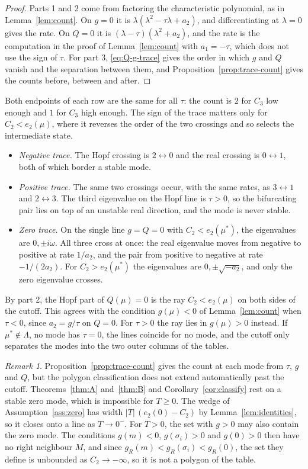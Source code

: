 \documentclass[11pt]{article}
\theoremstyle{definition}
\theoremstyle{remark}
\newtheorem{remark}{Remark}
\begin{document}
\begin{proof}
Parts 1 and 2 come from factoring the characteristic polynomial, as in Lemma~\ref{lem:count}. On $g=0$ it is $\lambda(\lambda^2-\tau\lambda+a_2)$, and differentiating at $\lambda=0$ gives the rate. On $Q=0$ it is $(\lambda-\tau)(\lambda^2+a_2)$, and the rate is the computation in the proof of Lemma~\ref{lem:count} with $a_1=-\tau$, which does not use the sign of $\tau$. For part 3, \eqref{eq:Q-g-trace} gives the order in which $g$ and $Q$ vanish and the separation between them, and Proposition~\ref{prop:trace-count} gives the counts before, between and after.
\end{proof}

Both endpoints of each row are the same for all $\tau$: the count is $2$ for $C_3$ low enough and $1$ for $C_3$ high enough. The sign of the trace matters only for $C_2<e_2(\mu)$, where it reverses the order of the two crossings and so selects the intermediate state.
\begin{itemize}
\item \emph{Negative trace.} The Hopf crossing is $2\leftrightarrow0$ and the real crossing is $0\leftrightarrow1$, both of which border a stable mode.
\item \emph{Positive trace.} The same two crossings occur, with the same rates, as $3\leftrightarrow1$ and $2\leftrightarrow3$. The third eigenvalue on the Hopf line is $\tau>0$, so the bifurcating pair lies on top of an unstable real direction, and the mode is never stable.
\item \emph{Zero trace.} On the single line $g=Q=0$ with $C_2<e_2(\mu^*)$, the eigenvalues are $0,\pm i\omega$. All three cross at once: the real eigenvalue moves from negative to positive at rate $1/a_2$, and the pair from positive to negative at rate $-1/(2a_2)$. For $C_2>e_2(\mu^*)$ the eigenvalues are $0,\pm\sqrt{-a_2}$, and only the zero eigenvalue crosses.
\end{itemize}
By part 2, the Hopf part of $Q(\mu)=0$ is the ray $C_2<e_2(\mu)$ on both sides of the cutoff. This agrees with the condition $g(\mu)<0$ of Lemma~\ref{lem:count} when $\tau<0$, since $a_2=g/\tau$ on $Q=0$. For $\tau>0$ the ray lies in $g(\mu)>0$ instead. If $\mu^*\notin\Lambda$, no mode has $\tau=0$, the lines coincide for no mode, and the cutoff only separates the modes into the two outer columns of the tables.

\begin{remark}
Proposition~\ref{prop:trace-count} gives the count at each mode from $\tau$, $g$ and $Q$, but the polygon classification does not extend automatically past the cutoff. Theorems~\ref{thm:A} and~\ref{thm:B} and Corollary~\ref{cor:classify} rest on a stable zero mode, which is impossible for $T\ge0$. The wedge of Assumption~\ref{ass:zero} has width $|T|\,(e_2(0)-C_2)$ by Lemma~\ref{lem:identities}, so it closes onto a line as $T\to0^-$. For $T>0$, the set with $g>0$ may also contain the zero mode. The conditions $g(m)<0$, $g(\sigma_i)>0$ and $g(0)>0$ then have no right neighbour $M$, and since $g_R(m)<g_R(\sigma_i)<g_R(0)$, the set they define is unbounded as $C_2\to-\infty$, so it is not a polygon of the table.
\end{remark}
\end{document}
